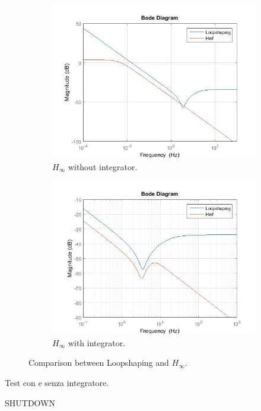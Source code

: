 \begin{figure}[H]

\begin{subfigure}{0.49\textwidth}
\includegraphics[width=\textwidth]{img/hinf_ls.jpg}
\caption{$H_{\infty}$ without integrator.}
\end{subfigure}

\begin{subfigure}{0.49\textwidth}
\includegraphics[width=\textwidth]{img/hinf_integrator_ls.jpg}
\caption{$H_{\infty}$ with integrator.}
\end{subfigure}

\caption{Comparison between Loopshaping and $H_{\infty}$.}
\end{figure}

Test con e senza integratore.

SHUTDOWN